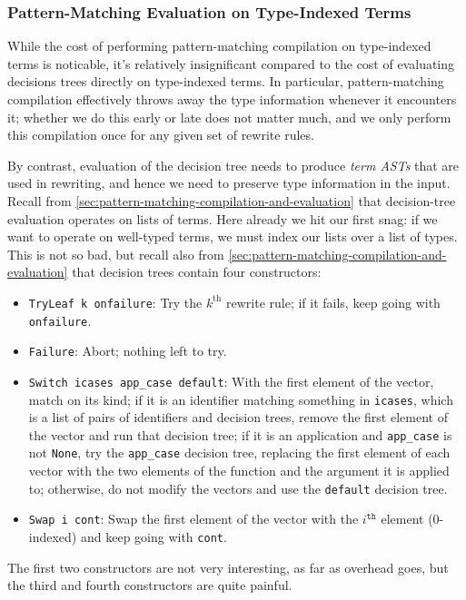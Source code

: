 \subsubsection{Pattern-Matching Evaluation on Type-Indexed Terms}\label{sec:rewriting-more:AST:type-indexed-pattern-matching}
While the cost of performing pattern-matching compilation on type-indexed terms is noticable, it's relatively insignificant compared to the cost of evaluating decisions trees directly on type-indexed terms.
In particular, pattern-matching compilation effectively throws away the type information whenever it encounters it; whether we do this early or late does not matter much, and we only perform this compilation once for any given set of rewrite rules.

By contrast, evaluation of the decision tree needs to produce \emph{term ASTs} that are used in rewriting, and hence we need to preserve type information in the input.
Recall from \autoref{sec:pattern-matching-compilation-and-evaluation} that decision-tree evaluation operates on lists of terms.
Here already we hit our first snag: if we want to operate on well-typed terms, we must index our lists over a list of types.
This is not so bad, but recall also from \autoref{sec:pattern-matching-compilation-and-evaluation} that decision trees contain four constructors:
\begin{itemize}
  \item \texttt{TryLeaf k onfailure}: Try the $k^\text{th}$ rewrite rule; if it fails, keep going with \texttt{onfailure}.
  \item \texttt{Failure}: Abort; nothing left to try.
  \item \texttt{Switch icases app\_case default}:
    With the first element of the vector, match on its kind; if it is an identifier matching something in \texttt{icases}, which is a list of pairs of identifiers and decision trees, remove the first element of the vector and run that decision tree; if it is an application and \texttt{app\_case} is not \texttt{None}, try the \texttt{app\_case} decision tree, replacing the first element of each vector with the two elements of the function and the argument it is applied to; otherwise, do not modify the vectors and use the \texttt{default} decision tree.
  \item \texttt{Swap i cont}: Swap the first element of the vector with the $i^\texttt{th}$ element (0-indexed) and keep going with \texttt{cont}.
\end{itemize}
The first two constructors are not very interesting, as far as overhead goes, but the third and fourth constructors are quite painful.

